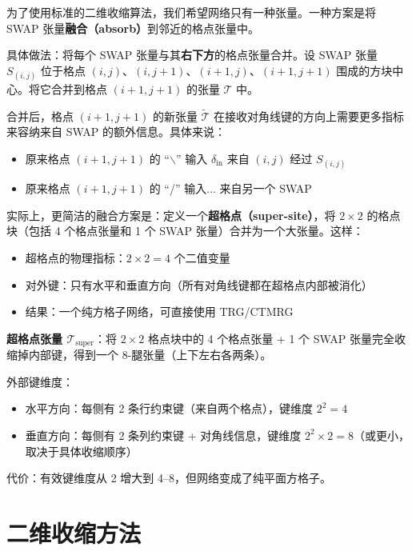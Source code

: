 \documentclass[12pt,a4paper]{ctexart}
\begin{document}
为了使用标准的二维收缩算法，我们希望网络只有一种张量。一种方案是将 SWAP 张量\textbf{融合（absorb）}到邻近的格点张量中。

具体做法：将每个 SWAP 张量与其\textbf{右下方}的格点张量合并。设 SWAP 张量 $S_{(i,j)}$ 位于格点 $(i,j)$、$(i,j+1)$、$(i+1,j)$、$(i+1,j+1)$ 围成的方块中心。将它合并到格点 $(i+1,j+1)$ 的张量 $\mathcal{T}$ 中。

合并后，格点 $(i+1,j+1)$ 的新张量 $\widetilde{\mathcal{T}}$ 在接收对角线键的方向上需要更多指标来容纳来自 SWAP 的额外信息。具体来说：
\begin{itemize}
\item 原来格点 $(i+1,j+1)$ 的 ``$\backslash$'' 输入 $\delta_{\text{in}}$ 来自 $(i,j)$ 经过 $S_{(i,j)}$
\item 原来格点 $(i+1,j+1)$ 的 ``/'' 输入... 来自另一个 SWAP
\end{itemize}

实际上，更简洁的融合方案是：定义一个\textbf{超格点（super-site）}，将 $2 \times 2$ 的格点块（包括 4 个格点张量和 1 个 SWAP 张量）合并为一个大张量。这样：
\begin{itemize}
\item 超格点的物理指标：$2 \times 2 = 4$ 个二值变量
\item 对外键：只有水平和垂直方向（所有对角线键都在超格点内部被消化）
\item 结果：一个纯方格子网络，可直接使用 TRG/CTMRG
\end{itemize}

\begin{tcolorbox}[title=超格点方案, colback=yellow!5, colframe=tensororange]
\textbf{超格点张量 $\mathcal{T}_{\text{super}}$}：将 $2 \times 2$ 格点块中的 4 个格点张量 + 1 个 SWAP 张量完全收缩掉内部键，得到一个 8-腿张量（上下左右各两条）。

外部键维度：
\begin{itemize}
\item 水平方向：每侧有 2 条行约束键（来自两个格点），键维度 $2^2 = 4$
\item 垂直方向：每侧有 2 条列约束键 + 对角线信息，键维度 $2^2 \times 2 = 8$（或更小，取决于具体收缩顺序）
\end{itemize}

代价：有效键维度从 2 增大到 4--8，但网络变成了纯平面方格子。
\end{tcolorbox}


\section{二维收缩方法}
\end{document}
